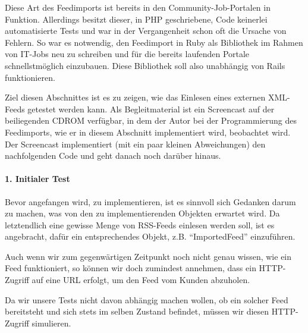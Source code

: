 Diese Art des Feedimports ist bereits in den Community-Job-Portalen in Funktion. Allerdings besitzt dieser, in PHP geschriebene, Code keinerlei automatisierte Tests und war in der Vergangenheit schon oft die Ursache von Fehlern. So war es notwendig, den Feedimport in Ruby als Bibliothek im Rahmen von IT-Jobs neu zu schreiben und für die bereits laufenden Portale schnellstmöglich einzubauen.
Diese Bibliothek soll also unabhängig von Rails funktionieren.

Ziel diesen Abschnittes ist es zu zeigen, wie das Einlesen eines externen XML-Feeds getestet werden kann.
Als Begleitmaterial ist ein Screencast auf der beiliegenden CDROM verfügbar, in dem der Autor bei der Programmierung
des Feedimports, wie er in diesem Abschnitt implementiert wird, beobachtet wird. Der Screencast implementiert 
(mit ein paar kleinen Abweichungen) den nachfolgenden Code und geht danach noch darüber hinaus.

\paragraph{1. Initialer Test}

Bevor angefangen wird, zu implementieren, ist es sinnvoll sich Gedanken darum zu machen, was von den zu implementierenden Objekten erwartet wird. Da letztendlich eine gewisse Menge von RSS-Feeds einlesen werden soll, ist es angebracht, dafür ein entsprechendes Objekt, z.B. "`ImportedFeed"' einzuführen.

Auch wenn wir zum gegenwärtigen Zeitpunkt noch nicht genau wissen, wie ein Feed funktioniert, so können wir doch zumindest annehmen, dass ein HTTP-Zugriff auf eine URL erfolgt, um den Feed vom Kunden abzuholen.

Da wir unsere Tests nicht davon abhängig machen wollen, ob ein solcher Feed bereitsteht und sich stets im selben Zustand befindet, müssen wir diesen HTTP-Zugriff simulieren.

\begin{ruby}[label=test/test\_imported\_feed.rb]
    
  

   

    
\end{ruby}





